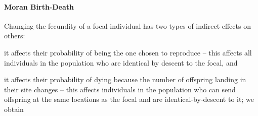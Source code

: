 \documentclass[11pt, letterpaper]{article}
\begin{document}
\paragraph{Moran Birth-Death} Changing the fecundity of a focal individual has two types of indirect effects on others: \begin{inparaenum}[\it i\rm )]\item it affects their probability of being the one chosen to reproduce -- this affects all individuals in the population who are identical by descent to the focal, and \item it affects their probability of dying because the number of offspring landing in their site changes -- this affects individuals in the population who can send offspring at the same locations as the focal and are identical-by-descent to it; we obtain  \end{inparaenum}
%
\end{document}
